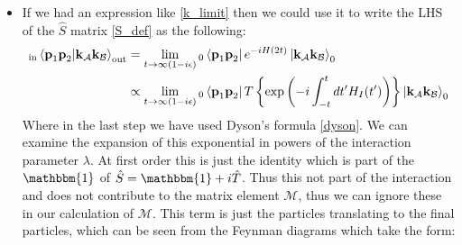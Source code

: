 \documentclass[11pt]{article}
\numberwithin{equation}{section}
\begin{document}
\begin{itemize}
  \item If we had an expression like \ref{k_limit} then we could use it to write the LHS of the $\hat{S}$ matrix \ref{S_def} as the following:
  \begin{align}
  \label{p_dyson}
     {}_{\text{in}}\braket{\textbf{p}_1\textbf{p}_2|\textbf{k}_{\mathcal{A}}\textbf{k}_{\mathcal{B}}}_{\text{out}} & = \lim_{t\rightarrow\infty(1-i\epsilon)}{}_{0}\bra{\textbf{p}_1\textbf{p}_2 }e^{-iH(2t)}\ket{\textbf{k}_{\mathcal{A}}\textbf{k}_{\mathcal{B}}}_{0} \nonumber\\
     & \propto \lim_{t\rightarrow\infty(1-i\epsilon)}{}_{0}\bra{\textbf{p}_1\textbf{p}_2}T\left\{\text{exp}\left(-i\int_{-t}^{t}dt'H_{I}(t')\right)\right\}\ket{\textbf{k}_{\mathcal{A}}\textbf{k}_{\mathcal{B}}}_{0}
   \end{align} 
   Where in the last step we have used Dyson's formula \ref{dyson}. We can examine the expansion of this exponential in powers of the interaction parameter $\lambda$. At first order this is just the identity which is part of the $\mathbbm{1}$ of $\hat{S} = \mathbbm{1}+i\hat{T}$. Thus this not part of the interaction and does not contribute to the matrix element $\mathcal{M}$, thus we can ignore these in our calculation of $\mathcal{M}$. This term is just the particles translating to the final particles, which can be seen from the Feynman diagrams which take the form: 
   \begin{center}
\end{center}


\end{itemize}
\end{document}
